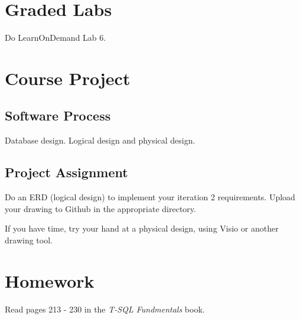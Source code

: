\documentclass{article}
\begin{document}
    \section{Graded Labs}

    Do LearnOnDemand Lab 6.

    \section{Course Project}

        \subsection{Software Process}

        Database design. Logical design and physical design.
        
        \subsection{Project Assignment}

        Do an ERD (logical design) to implement your iteration 2 requirements. Upload your drawing to Github in the appropriate directory.

        If you have time, try your hand at a physical design, using Visio or another drawing tool.

    \section{Homework}

        Read pages 213 - 230 in the \textit{T-SQL Fundmentals} book.
        
\end{document}
